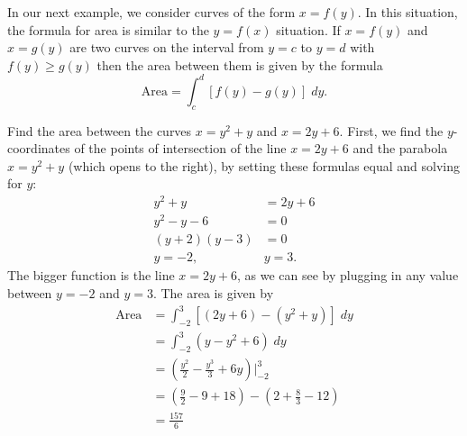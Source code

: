 \documentclass{ximera}
\begin{document}
In our next example, we consider curves of the form $x = f(y)$. In this situation, the formula for area is similar to the $y = f(x)$ situation.
If $x = f(y)$ and $x=g(y)$ are two curves on the interval from $y = c$ to $y = d$ with $f(y) \geq g(y)$
then the area between them is given by the formula
\[
\text{Area} = \int_c^d [f(y) - g(y)] \; dy.
\]
\begin{example}
Find the area between the curves $x = y^2 + y$ and $x = 2y + 6$.
First, we find the $y$-coordinates of the points of intersection of the line $x = 2y+6$ 
and the parabola $x=y^2 + y$ (which opens to the right), by setting these formulas equal and solving for $y$:
\begin{align*}
y^2 + y &= 2y + 6 \\
y^2 - y - 6 &= 0 \\
(y+2)(y-3) &= 0 \\
y = -2, & y = 3.
\end{align*}
The bigger function is the line $x = 2y+6$, as we can see by plugging in any value between $y = -2$ and $y=3$.
The area is given by
\begin{align*}
\text{Area} &= \int_{-2}^3 \left[(2y+6) - (y^2+y) \right] \; dy \\
            &= \int_{-2}^3 \left(y - y^2 + 6\right) \; dy \\
            &= \left(\frac{y^2}{2} - \frac{y^3}{3} + 6y \right) \bigg|_{-2}^{3} \\
            &= \left(\tfrac92 - 9 + 18\right) - \left(2 + \tfrac83 - 12\right)\\
            &= \tfrac{157}{6}         
\end{align*}


\begin{center}
\end{center}
\end{example}
\end{document}
